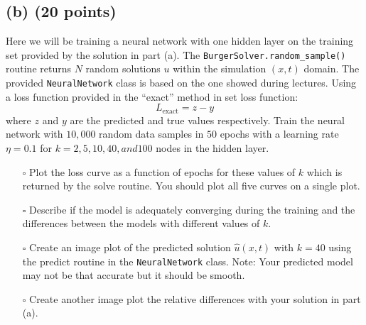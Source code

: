 \documentclass{article}
\begin{document}
\subsection*{(b) (20 points)}
Here we will be training a neural network with one hidden layer on the training set provided by the solution in part (a). The \texttt{BurgerSolver.random\_sample()} routine returns $N$ random solutions $u$ within the simulation $(x, t)$ domain. The provided \texttt{NeuralNetwork} class is based on the one showed during lectures. Using a loss function provided in the “exact” method in set loss function:
\begin{equation}
    L_{\text{exact}} = z - y  \tag{4}
\end{equation}
where $z$ and $y$ are the predicted and true values respectively. Train the neural network with $10,000$ random data samples in $50$ epochs with a learning rate $\eta = 0.1$ for $k = 2, 5, 10, 40, and 100$ nodes in the hidden layer.
\begin{itemize}
    \item[$\square$] Plot the loss curve as a function of epochs for these values of $k$ which is returned by the solve routine. You should plot all five curves on a single plot.
    \item[$\square$] Describe if the model is adequately converging during the training and the differences between the models with different values of $k$.
    \item[$\square$] Create an image plot of the predicted solution $\hat{u}(x, t)$ with $k = 40$ using the predict routine in the \texttt{NeuralNetwork} class. Note: Your predicted model may not be that accurate but it should be smooth.
    \item[$\square$] Create another image plot the relative differences with your solution in part (a).
\end{itemize}
\end{document}

